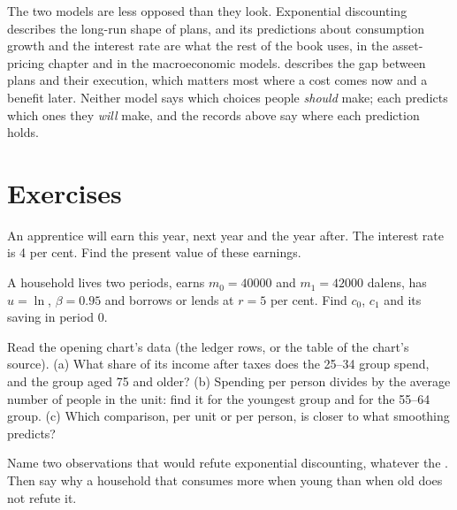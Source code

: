 The two models are less opposed than they look. Exponential discounting describes the long-run shape
of plans, and its predictions about consumption growth and the interest rate are what the rest of the
book uses, in the asset-pricing chapter and in the macroeconomic models.  describes the
gap between plans and their execution, which matters most where a cost comes now and a benefit later.
Neither model says which choices people \emph{should} make; each predicts which ones they \emph{will}
make, and the records above say where each prediction holds.

\section{Exercises}\label{sec:b2:intertemporal-choice:exercises}

\begin{exercise}[$\star$]\label{exo:b2:intertemporal-choice:1}
An apprentice will earn  this year,  next year and  the year after.
The interest rate is 4 per cent. Find the present value of these earnings.
\end{exercise}

\begin{exercise}[$\star$]\label{exo:b2:intertemporal-choice:2}
A household lives two periods, earns $m_0 = \num{40000}$ and $m_1 = \num{42000}$ dalens, has $u = \ln$,
$\beta = 0.95$ and borrows or lends at $r = 5$ per cent. Find $c_0$, $c_1$ and its saving in period 0.
\end{exercise}

\begin{exercise}[$\star$]\label{exo:b2:intertemporal-choice:3}
Read the opening chart's data (the ledger rows, or the table of the chart's source). (a) What share of
its income after taxes does the 25--34 group spend, and the group aged 75 and older? (b) Spending per
person divides by the average number of people in the unit: find it for the youngest group and for the
55--64 group. (c) Which comparison, per unit or per person, is closer to what smoothing predicts?
\end{exercise}

\begin{exercise}[$\star$]\label{exo:b2:intertemporal-choice:4}
Name two observations that would refute exponential discounting, whatever the . Then
say why a household that consumes more when young than when old does not refute it.
\end{exercise}

